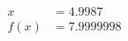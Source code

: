 \documentclass[preview]{standalone}
\begin{document}
\begin{align*}
x &= 4.9987\\f(x) &= 7.9999998
\end{align*}
\end{document}
